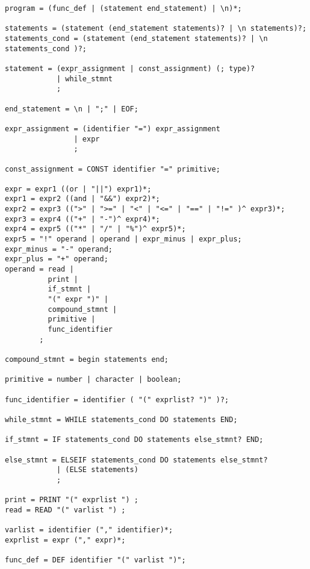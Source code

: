 \documentclass[paper=a4, fontsize=11pt]{article}
\numberwithin{equation}{section}		%
\numberwithin{figure}{section}			%
\numberwithin{table}{section}				%
\begin{document}
\begin{verbatim}
program = (func_def | (statement end_statement) | \n)*;

statements = (statement (end_statement statements)? | \n statements)?;
statements_cond = (statement (end_statement statements)? | \n statements_cond )?;

statement = (expr_assignment | const_assignment) (; type)?
			| while_stmnt 
			;

end_statement = \n | ";" | EOF;

expr_assignment = (identifier "=") expr_assignment
				| expr 
				;

const_assignment = CONST identifier "=" primitive;

expr = expr1 ((or | "||") expr1)*;
expr1 = expr2 ((and | "&&") expr2)*;
expr2 = expr3 ((">" | ">=" | "<" | "<=" | "==" | "!=" )^ expr3)*;
expr3 = expr4 (("+" | "-")^ expr4)*;
expr4 = expr5 (("*" | "/" | "%")^ expr5)*;
expr5 = "!" operand | operand | expr_minus | expr_plus;
expr_minus = "-" operand;
expr_plus = "+" operand;
operand = read |
	   	  print |
	   	  if_stmnt |
	   	  "(" expr ")" |
	   	  compound_stmnt |
	   	  primitive |
	   	  func_identifier
		;
		  
compound_stmnt = begin statements end;

primitive = number | character | boolean;

func_identifier = identifier ( "(" exprlist? ")" )?;

while_stmnt = WHILE statements_cond DO statements END;

if_stmnt = IF statements_cond DO statements else_stmnt? END;

else_stmnt = ELSEIF statements_cond DO statements else_stmnt?
			| (ELSE statements)
			;

print = PRINT "(" exprlist ") ;
read = READ "(" varlist ") ;

varlist = identifier ("," identifier)*;
exprlist = expr ("," expr)*;

func_def = DEF identifier "(" varlist ")";
\end{verbatim}
\end{document}
